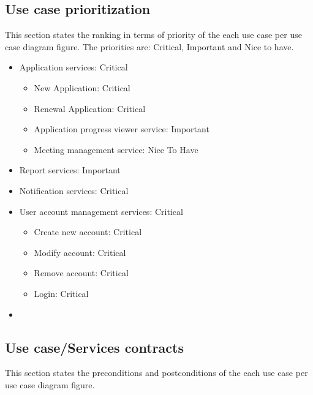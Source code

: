 \documentclass[12pt]{article}
\begin{document}
\subsection{Use case prioritization} %
\vspace{0.2in}
This section states the ranking in terms of priority of the each use case per use case diagram figure. The priorities are: Critical, Important and Nice to have.\\ 
\begin{itemize}
	\item Application services: Critical
	\begin{itemize}
		\item New Application: Critical
		\item Renewal Application: Critical
		\item Application progress viewer service: Important
		\item Meeting management service: Nice To Have
	\end{itemize}
	\item Report services: Important
	\item Notification services: Critical
	\item User account management services: Critical
	\begin{itemize}
		\item Create new account: Critical
		\item Modify account: Critical
		\item Remove account: Critical
		\item Login: Critical
	\end{itemize}
	\item 
\end{itemize}


\vspace{0.2in}

\subsection{Use case/Services contracts} %
\vspace{0.2in}

This section states the preconditions and postconditions of the each use case per use case diagram figure. \\
\end{document}
